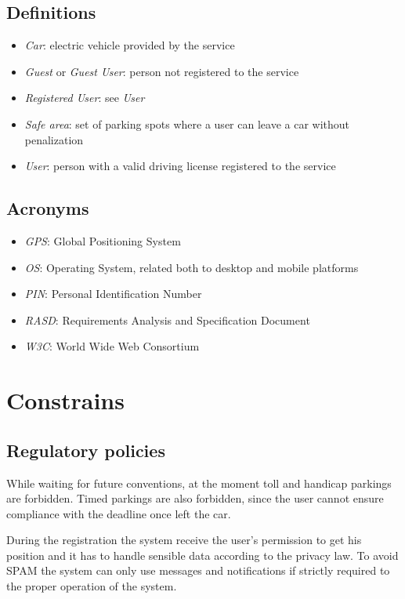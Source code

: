 \subsection{Definitions}
\begin{itemize}
	\item \emph{Car}: electric vehicle provided by the service
	\item \emph{Guest} or \emph{Guest User}: person not registered to the service
	\item \emph{Registered User}: see \emph{User}
	\item \emph{Safe area}: set of parking spots where a user can leave a car without penalization 
	\item \emph{User}: person with a valid driving license registered to the service
\end{itemize}

\subsection{Acronyms}
\begin{itemize}
	\item \emph{GPS}: Global Positioning System
	\item \emph{OS}: Operating System, related both to desktop and mobile platforms
	\item \emph{PIN}: Personal Identification Number
	\item \emph{RASD}: Requirements Analysis and Specification Document
	\item \emph{W3C}: World Wide Web Consortium
\end{itemize}

\section{Constrains}

\subsection{Regulatory policies}
While waiting for future conventions, at the moment toll and handicap parkings are forbidden. Timed parkings are also forbidden, since the user cannot ensure compliance with the deadline once left the car.

During the registration the system receive the user's permission to get his position and it has to handle sensible data according to the privacy law. To avoid SPAM the system can only use messages and notifications if strictly required to the proper operation of the system.

